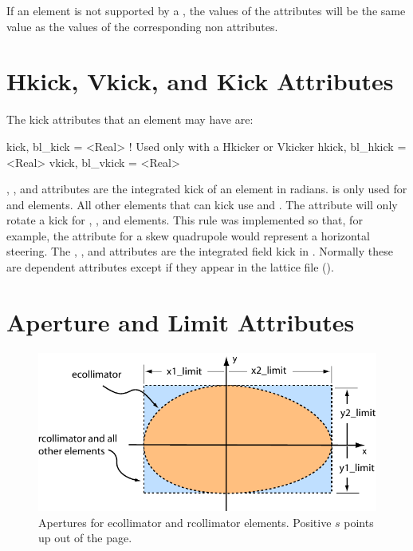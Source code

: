 If an element is not supported by a , the values of the
 attributes will be the same value as the values of the
corresponding non  attributes.

\section{Hkick, Vkick, and Kick Attributes}
\label{s:kick}


The kick attributes that an element may have are:
\begin{example}
  kick,  bl_kick  = <Real>  ! Used only with a Hkicker or Vkicker
  hkick, bl_hkick = <Real>
  vkick, bl_vkick = <Real>
\end{example}
, , and  attributes are the integrated
kick of an element in radians.  is only used for 
and  elements. All other elements that can kick use
 and . The  attribute will only rotate a
kick for , ,  and 
elements. This rule was implemented so that, for example, the
 attribute for a skew quadrupole would represent a
horizontal steering. The , , and
 attributes are the integrated field kick in
. Normally these are dependent attributes except if
they appear in the lattice file ().

\section{Aperture and Limit Attributes}
\label{s:limit}

\begin{figure}[ht]
  \centering
  \includegraphics{apertures.pdf}
  \caption[Apertures for ecollimator and rcollimator elements.]
  {Apertures for ecollimator and rcollimator elements. 
  Positive $s$ points up out of the page.}
  \label{f:limit}
\end{figure}

